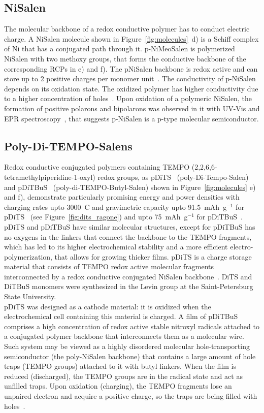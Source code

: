 \subsection{NiSalen}
The molecular backbone of a redox conductive polymer has to conduct electric charge. A NiSalen molecule shown in Figure~\ref{fig:molecules}~d) is a Schiff complex of Ni that has a conjugated path through it. p-NiMeoSalen is polymerized NiSalen with two methoxy groups, that forms the conductive backbone of the corresponding RCPs in e) and f). The pNiSalen backbone is redox active and can store up to 2 positive charges per monomer unit~\cite{Dmitrieva2018}. The conductivity of p-NiSalen depends on its oxidation state. The oxidized polymer has higher conductivity due to a higher concentration of holes~\cite{Dmitrieva2018}. Upon oxidation of a polymeric NiSalen, the formation of positive polarons and bipolarons was observed in it with UV-Vis and EPR spectroscopy~\cite{Dmitrieva2018}, that suggests p-NiSalen is a p-type molecular semiconductor.


\subsection{Poly-Di-TEMPO-Salens}
Redox conductive conjugated polymers containing TEMPO (2,2,6,6-tetramethylpiperidine-1-oxyl) redox groups, as pDiTS~\cite{Vereshchagin2020,Kulikov2022} (poly-Di-Tempo-Salen) and pDiTBuS~\cite{Kulikov2023} (poly-di-TEMPO-Butyl-Salen) shown in Figure~\ref{fig:molecules} e) and f), demonstrate particularly promising energy and power densities with charging rates upto 3000~C and gravimetric capacity upto 91.5~mAh~g$^{-1}$ for pDiTS~\cite{Vereshchagin2020} (see Figure~\ref{fig:dits_ragone}) and upto 75~mAh~g$^{-1}$ for pDiTBuS~\cite{Kulikov2023}. pDiTS and pDiTBuS have similar molecular structures, except for pDiTBuS has no oxygens in the linkers that connect the backbone to the TEMPO fragments, which has led to its higher electrochemical stability and a more efficient electro-polymerization, that allows for growing thicker films. pDiTS is a charge storage material that consists of TEMPO redox active molecular fragments~\cite{Vereshchagin2022,jeschke2012_annrevphyschem,Halbmair2016} interconnected by a redox conductive conjugated NiSalen backbone~\cite{Vereshchagin2020,Dmitrieva2018}. DiTS and DiTBuS monomers were synthesized in the Levin group at the Saint-Petersburg State University.\\
pDiTS was designed as a cathode material: it is oxidized when the electrochemical cell containing this material is charged. A film of pDiTBuS comprises a high concentration of redox active stable nitroxyl radicals attached to a conjugated polymer backbone that interconnects them as a molecular wire. Such system may be viewed as a highly disordered molecular hole-transporting semiconductor (the poly-NiSalen backbone) that contains a large amount of hole traps (TEMPO groups) attached to it with butyl linkers. When the film is reduced (discharged), the TEMPO groups are in the radical state and act as unfilled traps. Upon oxidation (charging), the TEMPO fragments lose an unpaired electron and acquire a positive charge, so the traps are being filled with holes~\cite{Kulikov2023}.

